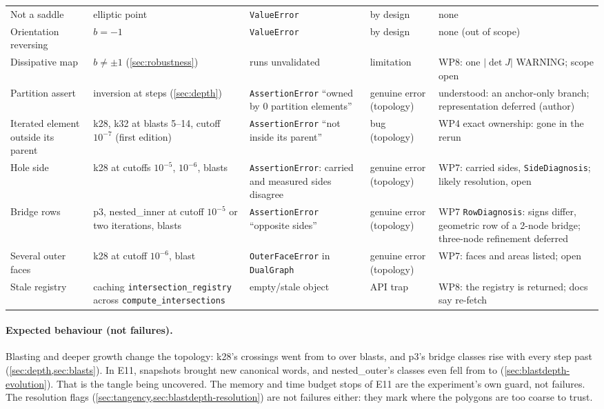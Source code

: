 \documentclass[11pt,a4paper]{article}
\newcommand{\code}[1]{\texttt{#1}}
\begin{document}
\begin{table}[p]
\begin{tabularx}{\textwidth}{@{}>{\raggedright\arraybackslash}p{2.2cm} Y Y >{\raggedright\arraybackslash}p{1.6cm} Y@{}}
Not a saddle & elliptic point & \code{ValueError} & by design & none \\
Orientation reversing & $b=-1$ & \code{ValueError} & by design & none (out of scope) \\
Dissipative map & $b\ne\pm1$ (\cref{sec:robustness}) & runs unvalidated & limitation & WP8: one $|\det J|$ WARNING; scope open \\
Partition assert & inversion at \NumInversionAssertSteps{} steps (\cref{sec:depth}) & \code{AssertionError} ``owned by 0 partition elements'' & genuine error (topology) & understood: an anchor-only branch; representation deferred (author) \\
Iterated element outside its parent & k28, k32 at blasts 5--14, cutoff $10^{-7}$ (first edition) & \code{AssertionError} ``not inside its parent'' & bug (topology) & WP4 exact ownership: gone in the rerun \\
Hole side & k28 at cutoffs $10^{-5}$, $10^{-6}$, blasts \NumDeepErrHoleSideBlasts{} & \code{AssertionError}: carried and measured sides disagree & genuine error (topology) & WP7: carried sides, \code{SideDiagnosis}; likely resolution, open \\
Bridge rows & p3, nested\_inner at cutoff $10^{-5}$ or two iterations, blasts \NumDeepErrBridgeRowsBlasts{} & \code{AssertionError} ``opposite sides'' & genuine error (topology) & WP7 \code{RowDiagnosis}: signs differ, geometric row of a 2-node bridge; three-node refinement deferred \\
Several outer faces & k28 at cutoff $10^{-6}$, blast \NumDeepErrOuterFacesBlasts{} & \code{OuterFaceError} in \code{DualGraph} & genuine error (topology) & WP7: faces and areas listed; open \\
Stale registry & caching \code{intersection\_registry} across \code{compute\_intersections} & empty/stale object & API trap & WP8: the registry is returned; docs say re-fetch \\
\bottomrule
\end{tabularx}
\end{table}

\paragraph{Expected behaviour (not failures).} Blasting and deeper growth
change the topology: k28's crossings went from
\NumBlastCrossingsStartKTwoEight{} to \NumBlastCrossingsEndKTwoEight{} over
\NumMaxBlastsKTwoEight{} blasts, and p3's bridge classes rise with every
step past \NumDepthReliableMaxPThree{} (\cref{sec:depth,sec:blasts}). In
E11, \NumDeepStructureSteps{} snapshots brought new canonical words, and
nested\_outer's classes even fell from \NumDeepDropBeforeNestedOuter{} to
\NumDeepDropAfterNestedOuter{} (\cref{sec:blastdepth-evolution}). That is
the tangle being uncovered. The memory and time budget stops of E11 are the
experiment's own guard, not failures. The resolution flags
(\cref{sec:tangency,sec:blastdepth-resolution}) are not failures either:
they mark where the polygons are too coarse to trust.
\end{document}
